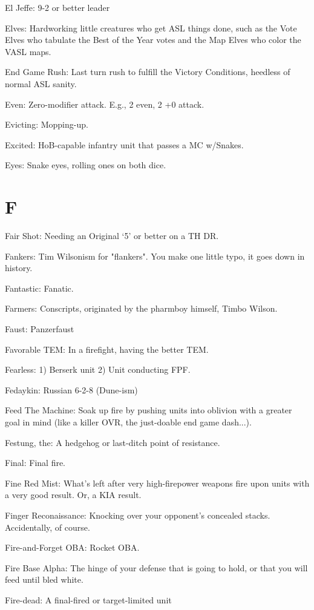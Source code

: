 \documentclass[letterpaper]{article}
\begin{document}
El Jeffe:  9-2 or better leader

Elves: Hardworking little creatures who get ASL things done, such as the Vote Elves who tabulate the Best of the Year votes and the Map Elves who color the VASL maps.

End Game Rush: Last turn rush to fulfill the Victory Conditions, heedless of normal ASL sanity.

Even: Zero-modifier attack. E.g., 2 even, 2 +0 attack.

Evicting: Mopping-up.

Excited: HoB-capable infantry unit that passes a MC w/Snakes.

Eyes: Snake eyes, rolling ones on both dice.

\section{F}

Fair Shot: Needing an Original `5' or better on a TH DR.

Fankers: Tim Wilsonism for "flankers". You make one little typo, it goes down in history.

Fantastic: Fanatic.

Farmers:  Conscripts, originated by the pharmboy himself, Timbo Wilson.

Faust: Panzerfaust

Favorable TEM: In a firefight, having the better TEM.

Fearless: 1) Berserk unit 2) Unit conducting FPF.

Fedaykin: Russian 6-2-8 (Dune-ism)

Feed The Machine: Soak up fire by pushing units into oblivion with a greater goal in mind (like a killer OVR, the just-doable end game dash...).

Festung, the: A hedgehog or last-ditch point of resistance.

Final: Final fire.

Fine Red Mist: What's left after very high-firepower weapons fire upon units with a very good result. Or, a KIA result.

Finger Reconaissance: Knocking over your opponent's concealed stacks.  Accidentally, of course.

Fire-and-Forget OBA: Rocket OBA.

Fire Base Alpha: The hinge of your defense that is going to hold, or that you will feed until bled white.

Fire-dead: A final-fired or target-limited unit
\end{document}
